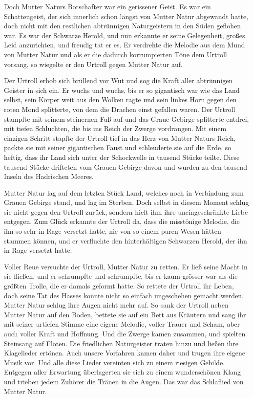 Doch Mutter Naturs Botschafter war ein gerissener Geist. Es war ein Schattengeist, der sich innerlich schon längst von Mutter Natur abgewandt hatte, doch nicht mit den restlichen abtrünnigen Naturgeistern in den Süden geflohen war. Es war der Schwarze Herold, und nun erkannte er seine Gelegenheit, großes Leid anzurichten, und freudig tat er es. Er verdrehte die Melodie aus dem Mund von Mutter Natur und als er die dadurch korrumpierten Töne dem Urtroll vorsang, so wiegelte er den Urtroll gegen Mutter Natur auf.

Der Urtroll erhob sich brüllend vor Wut und sog die Kraft aller abtrünnigen Geister in sich ein. Er wuchs und wuchs, bis er so gigantisch war wie das Land selbst, sein Körper weit aus den Wolken ragte und sein linkes Horn gegen den roten Mond splitterte, von dem die Drachen einst gefallen waren. Der Urtroll stampfte mit seinem steinernen Fuß auf und das Graue Gebirge splitterte entdrei, mit tiefen Schluchten, die bis ins Reich der Zwerge vordrangen. Mit einem einzigen Schritt stapfte der Urtroll tief in das Herz von Mutter Naturs Reich, packte sie mit seiner gigantischen Faust und schleuderte sie auf die Erde, so heftig, dass ihr Land sich unter der Schockwelle in tausend Stücke teilte. Diese tausend Stücke drifteten vom Grauen Gebirge davon und wurden zu den tausend Inseln des Hadrischen Meeres.

Mutter Natur lag auf dem letzten Stück Land, welches noch in Verbindung zum Grauen Gebirge stand, und lag im Sterben. Doch selbst in diesem Moment schlug sie nicht gegen den Urtroll zurück, sondern hielt ihm ihre uneingeschränkte Liebe entgegen. Zum Glück erkannte der Urtroll da, dass die misstönige Melodie, die ihn so sehr in Rage versetzt hatte, nie von so einem puren Wesen hätten stammen können, und er verfluchte den hinterhältigen Schwarzen Herold, der ihn in Rage versetzt hatte.

Voller Reue versuchte der Urtroll, Mutter Natur zu retten. Er ließ seine Macht in sie fließen, und er schrumpfte und schrumpfte, bis er kaum grösser war als die größten Trolle, die er damals geformt hatte. So rettete der Urtroll ihr Leben, doch seine Tat des Hasses konnte nicht so einfach ungeschehen gemacht werden. Mutter Natur schlug ihre Augen nicht mehr auf. So sank der Urtroll neben Mutter Natur auf den Boden, bettete sie auf ein Bett aus Kräutern und sang ihr mit seiner urtiefen Stimme eine eigene Melodie, voller Trauer und Scham, aber auch voller Kraft und Hoffnung. Und die Zwerge kamen zusammen, und spielten Steinsang auf Flöten. Die friedlichen Naturgeister traten hinzu und ließen ihre Klagelieder ertönen. Auch unsere Vorfahren kamen daher und trugen ihre eigene Musik vor. Und alle diese Lieder vereinten sich zu einem riesigen Gebilde. Entgegen aller Erwartung überlagerten sie sich zu einem wunderschönen Klang und trieben jedem Zuhörer die Tränen in die Augen. Das war das Schlaflied von Mutter Natur.

